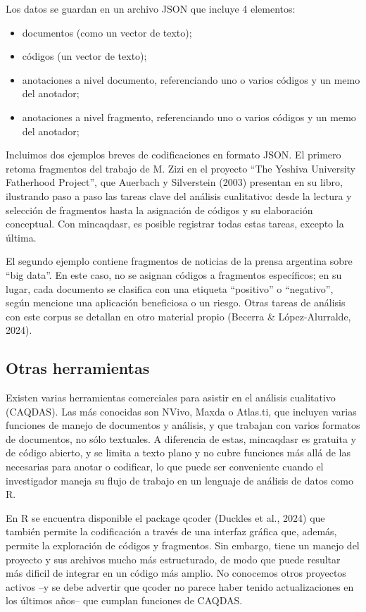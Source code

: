 \documentclass[
]{article}
\providecommand{\tightlist}{%
  \setlength{\itemsep}{0pt}\setlength{\parskip}{0pt}}
\begin{document}
Los datos se guardan en un archivo JSON que incluye 4 elementos:

\begin{itemize}
\tightlist
\item
  documentos (como un vector de texto);
\item
  códigos (un vector de texto);
\item
  anotaciones a nivel documento, referenciando uno o varios códigos y un
  memo del anotador;
\item
  anotaciones a nivel fragmento, referenciando uno o varios códigos y un
  memo del anotador;
\end{itemize}

Incluimos dos ejemplos breves de codificaciones en formato JSON. El
primero retoma fragmentos del trabajo de M. Zizi en el proyecto ``The
Yeshiva University Fatherhood Project'', que Auerbach y Silverstein
(2003) presentan en su libro, ilustrando paso a paso las tareas clave
del análisis cualitativo: desde la lectura y selección de fragmentos
hasta la asignación de códigos y su elaboración conceptual. Con
mincaqdasr, es posible registrar todas estas tareas, excepto la última.

El segundo ejemplo contiene fragmentos de noticias de la prensa
argentina sobre ``big data''. En este caso, no se asignan códigos a
fragmentos específicos; en su lugar, cada documento se clasifica con una
etiqueta ``positivo'' o ``negativo'', según mencione una aplicación
beneficiosa o un riesgo. Otras tareas de análisis con este corpus se
detallan en otro material propio (Becerra \& López-Alurralde, 2024).

\subsection{Otras herramientas}\label{otras-herramientas}

Existen varias herramientas comerciales para asistir en el análisis
cualitativo (CAQDAS). Las más conocidas son NVivo, Maxda o Atlas.ti, que
incluyen varias funciones de manejo de documentos y análisis, y que
trabajan con varios formatos de documentos, no sólo textuales. A
diferencia de estas, mincaqdasr es gratuita y de código abierto, y se
limita a texto plano y no cubre funciones más allá de las necesarias
para anotar o codificar, lo que puede ser conveniente cuando el
investigador maneja su flujo de trabajo en un lenguaje de análisis de
datos como R.

En R se encuentra disponible el package qcoder (Duckles et al., 2024)
que también permite la codificación a través de una interfaz gráfica
que, además, permite la exploración de códigos y fragmentos. Sin
embargo, tiene un manejo del proyecto y sus archivos mucho más
estructurado, de modo que puede resultar más dificil de integrar en un
código más amplio. No conocemos otros proyectos activos --y se debe
advertir que qcoder no parece haber tenido actualizaciones en los
últimos años-- que cumplan funciones de CAQDAS.
\end{document}

